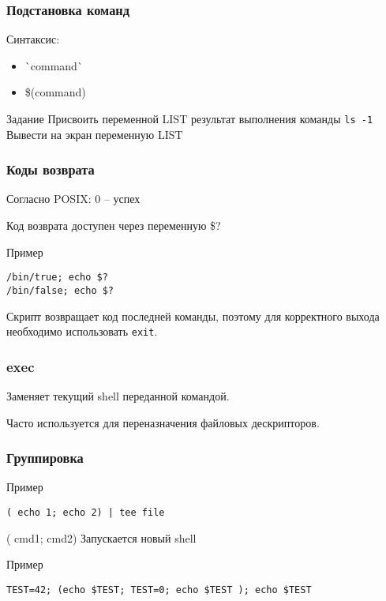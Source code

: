 
\begin{frame}
	\frametitle{Подстановка команд}
	
	Синтаксис:

	\begin{itemize}
		\item \`{}command\`{}
		\item \$(command)
	\end{itemize}
	\pause
	\begin{block}{Задание}
		Присвоить переменной LIST результат выполнения команды {\tt ls -1} \\
		Вывести на экран переменную LIST
	\end{block}
\end{frame}

\begin{frame}[fragile]
	\frametitle{Коды возврата}

	Согласно POSIX: 0 -- успех

	Код возврата доступен через переменную \$?

	\pause
	\begin{block}{Пример}
		\begin{lstlisting}
/bin/true; echo $?
/bin/false; echo $?
		\end{lstlisting}
	\end{block}

	Скрипт возвращает код последней команды, поэтому для корректного выхода необходимо использовать {\tt exit}.

\end{frame}


\begin{frame}
	\frametitle{exec}

	Заменяет текущий shell переданной командой. 

	Часто используется для переназначения файловых дескрипторов.

\end{frame}

\begin{frame}[fragile]
	\frametitle{Группировка}
	
	\begin{block}{Пример}
		\begin{lstlisting}
( echo 1; echo 2) | tee file
		\end{lstlisting}
	\end{block}

	\pause
	\begin{block}{( cmd1; cmd2)}
	    Запускается новый shell
	\end{block}

	\begin{block}{Пример}
		\begin{lstlisting}
TEST=42; (echo $TEST; TEST=0; echo $TEST ); echo $TEST
		\end{lstlisting}
	\end{block}

\end{frame}


